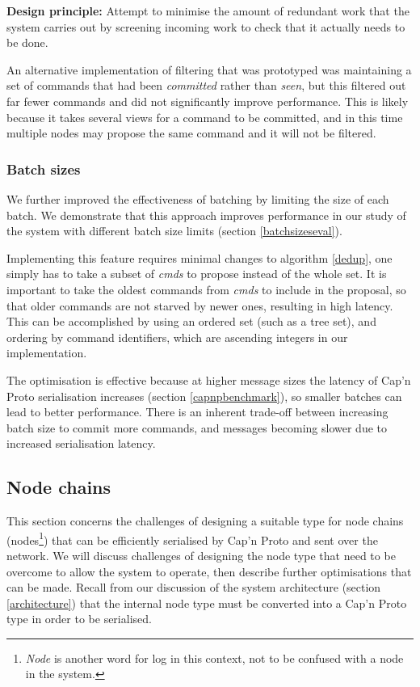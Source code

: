 \textbf{Design principle: } Attempt to minimise the amount of redundant work that the system carries out by screening incoming work to check that it actually needs to be done.

An alternative implementation of filtering that was prototyped was maintaining a set of commands that had been \textit{committed} rather than \textit{seen}, but this filtered out far fewer commands and did not significantly improve performance. This is likely because it takes several views for a command to be committed, and in this time multiple nodes may propose the same command and it will not be filtered.

\subsubsection{Batch sizes} \label{batchsizes}
We further improved the effectiveness of batching by limiting the size of each batch. We demonstrate that this approach improves performance in our study of the system with different batch size limits (section \ref{batchsizeseval}).

Implementing this feature requires minimal changes to algorithm \ref{dedup}, one simply has to take a subset of \textit{cmds} to propose instead of the whole set. It is important to take the oldest commands from \textit{cmds} to include in the proposal, so that older commands are not starved by newer ones, resulting in high latency. This can be accomplished by using an ordered set (such as a tree set), and ordering by command identifiers, which are ascending integers in our implementation.

The optimisation is effective because at higher message sizes the latency of Cap'n Proto serialisation increases (section \ref{capnpbenchmark}), so smaller batches can lead to better performance. There is an inherent trade-off between increasing batch size to commit more commands, and messages becoming slower due to increased serialisation latency.

\subsection{Node chains}
This section concerns the challenges of designing a suitable type for node chains (nodes\footnote{\textit{Node} is another word for log in this context, not to be confused with a node in the system.}) that can be efficiently serialised by Cap'n Proto and sent over the network. We will discuss challenges of designing the node type that need to be overcome to allow the system to operate, then describe further optimisations that can be made. Recall from our discussion of the system architecture (section \ref{architecture}) that the internal node type must be converted into a Cap'n Proto type in order to be serialised.


